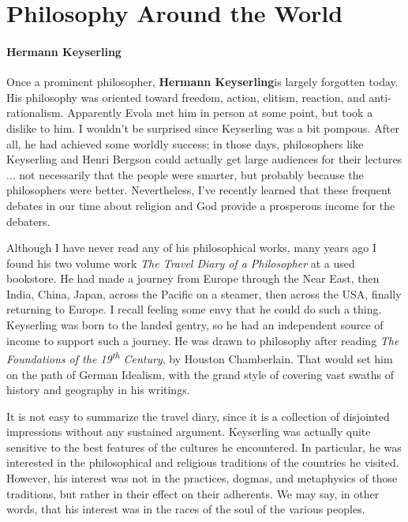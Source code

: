 \section{Philosophy Around the World}

\paragraph{Hermann Keyserling}

Once a prominent philosopher, \textbf{Hermann Keyserling}is largely forgotten today. His philosophy was oriented toward freedom, action, elitism, reaction, and anti-rationalism. Apparently Evola met him in person at some point, but took a dislike to him. I wouldn't be surprised since Keyserling was a bit pompous. After all, he had achieved some worldly success; in those days, philosophers like Keyserling and Henri Bergson could actually get large audiences for their lectures ... not necessarily that the people were smarter, but probably because the philosophers were better. Nevertheless, I've recently learned that these frequent debates in our time about religion and God provide a prosperous income for the debaters.

Although I have never read any of his philosophical works, many years ago I found his two volume work \emph{The Travel Diary of a Philosopher} at a used bookstore. He had made a journey from Europe through the Near East, then India, China, Japan, across the Pacific on a steamer, then across the USA, finally returning to Europe. I recall feeling some envy that he could do such a thing. Keyserling was born to the landed gentry, so he had an independent source of income to support such a journey. He was drawn to philosophy after reading \emph{The Foundations of the 19\textsuperscript{th} Century}, by Houston Chamberlain. That would set him on the path of German Idealism, with the grand style of covering vast swaths of history and geography in his writings.

It is not easy to summarize the travel diary, since it is a collection of disjointed impressions without any sustained argument. Keyserling was actually quite sensitive to the best features of the cultures he encountered. In particular, he was interested in the philosophical and religious traditions of the countries he visited. However, his interest was not in the practices, dogmas, and metaphysics of those traditions, but rather in their effect on their adherents. We may say, in other words, that his interest was in the races of the soul of the various peoples.

